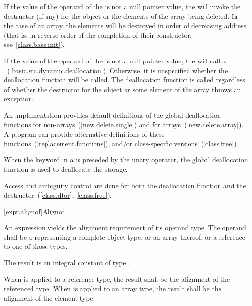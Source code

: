 \pnum
{}%
If the value of the operand of the  is not a
null pointer value, the  will invoke the
destructor (if any) for the object or the elements of the array being
deleted. In the case of an array, the elements will be destroyed in
order of decreasing address (that is, in reverse order of the completion
of their constructor; see~\ref{class.base.init}).

\pnum
If the value of the operand of the  is not a
null pointer value, the  will call a
%
%
~(\ref{basic.stc.dynamic.deallocation}).
Otherwise, it is unspecified whether the deallocation function will be
called.
\enternote
The deallocation function is called regardless of whether the destructor
for the object or some element of the array throws an exception.
\exitnote

\pnum
\enternote 
An implementation provides default definitions of the global
deallocation functions  for
non-arrays~(\ref{new.delete.single}) and
%
%
 for arrays~(\ref{new.delete.array}). A \Cpp
program can provide alternative definitions of these
functions~(\ref{replacement.functions}), and/or class-specific
versions~(\ref{class.free}).
\exitnote 

\pnum
When the keyword  in a  is
preceded by the unary \tcode{::} operator, the global deallocation
function is used to deallocate the storage.

\pnum
Access and ambiguity control are done for both the deallocation function
and the destructor~(\ref{class.dtor},~\ref{class.free}).

[expr.alignof]{Alignof}

\pnum
{}%
An  expression yields the alignment requirement
of its operand type. The operand shall be a 
representing a complete object type, or an array thereof, or a reference
to one of those types.

\pnum
The result is an integral constant of type
.

\pnum
When  is applied to a reference type, the result
shall be the alignment of the referenced type. When 
is applied to an array type, the result shall be the alignment of the
element type.

